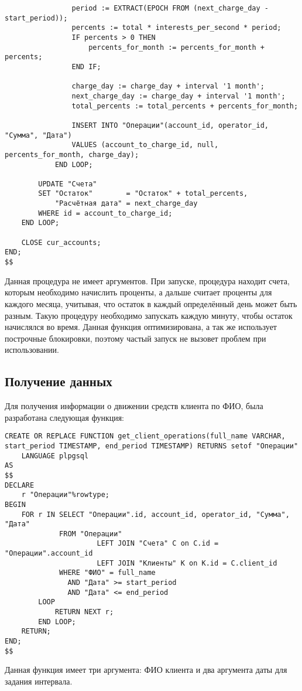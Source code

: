 \documentclass[14pt]{extarticle}
\begin{document}
\begin{verbatim}
                period := EXTRACT(EPOCH FROM (next_charge_day - start_period));
                percents := total * interests_per_second * period;
                IF percents > 0 THEN
                    percents_for_month := percents_for_month + percents;
                END IF;

                charge_day := charge_day + interval '1 month';
                next_charge_day := charge_day + interval '1 month';
                total_percents := total_percents + percents_for_month;

                INSERT INTO "Операции"(account_id, operator_id, "Сумма", "Дата")
                VALUES (account_to_charge_id, null, percents_for_month, charge_day);
            END LOOP;

        UPDATE "Счета"
        SET "Остаток"        = "Остаток" + total_percents,
            "Расчётная дата" = next_charge_day
        WHERE id = account_to_charge_id;
    END LOOP;

    CLOSE cur_accounts;
END;
$$
    \end{verbatim}
    Данная процедура не имеет аргументов. При запуске, процедура находит счета, которым необходимо начислить проценты, а дальше считает проценты для каждого месяца, учитывая, что остаток в каждый определённый день может быть разным. Такую процедуру необходимо запускать каждую минуту, чтобы остаток начислялся во время. Данная функция оптимизирована, а так же использует построчные блокировки, поэтому частый запуск не вызовет проблем при использовании.

    \newpage
    \subsection{Получение данных}

    Для получения информации о движении средств клиента по ФИО, была разработана следующая функция:
    \begin{verbatim}
CREATE OR REPLACE FUNCTION get_client_operations(full_name VARCHAR, start_period TIMESTAMP, end_period TIMESTAMP) RETURNS setof "Операции"
    LANGUAGE plpgsql
AS
$$
DECLARE
    r "Операции"%rowtype;
BEGIN
    FOR r IN SELECT "Операции".id, account_id, operator_id, "Сумма", "Дата"
             FROM "Операции"
                      LEFT JOIN "Счета" С on С.id = "Операции".account_id
                      LEFT JOIN "Клиенты" К on К.id = С.client_id
             WHERE "ФИО" = full_name
               AND "Дата" >= start_period
               AND "Дата" <= end_period
        LOOP
            RETURN NEXT r;
        END LOOP;
    RETURN;
END;
$$
    \end{verbatim}
    Данная функция имеет три аргумента: ФИО клиента и два аргумента даты для задания интервала.
\end{document}
